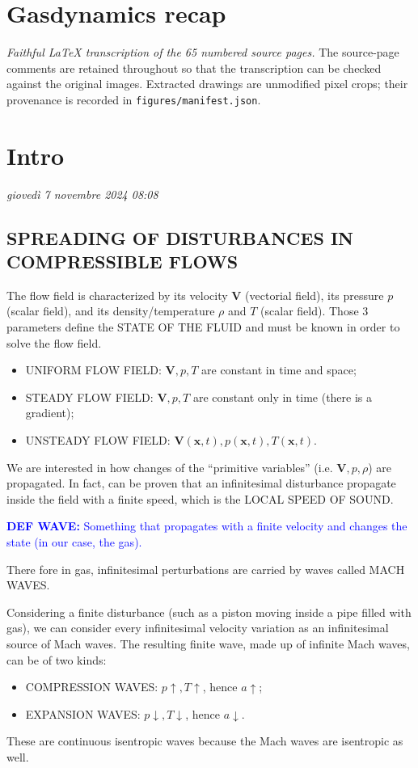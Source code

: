 \documentclass[11pt]{article}
\newcommand{\vect}[1]{\boldsymbol{#1}}
\begin{document}
\section*{Gasdynamics recap}
\textit{Faithful LaTeX transcription of the 65 numbered source pages.}
The source-page comments are retained throughout so that the transcription can
be checked against the original images.  Extracted drawings are unmodified
pixel crops; their provenance is recorded in \texttt{figures/manifest.json}.

\section*{Intro}
\textit{giovedì 7 novembre 2024 08:08}

\subsection*{SPREADING OF DISTURBANCES IN COMPRESSIBLE FLOWS}

The flow field is characterized by its velocity \(\vect{V}\) (vectorial
field), its pressure \(p\) (scalar field), and its density/temperature
\(\rho\) and \(T\) (scalar field). Those 3 parameters define the STATE OF THE
FLUID and must be known in order to solve the flow field.

\begin{itemize}
  \item UNIFORM FLOW FIELD: \(\vect{V},p,T\) are constant in time and space;
  \item STEADY FLOW FIELD: \(\vect{V},p,T\) are constant only in time (there
  is a gradient);
  \item UNSTEADY FLOW FIELD:
  \(\vect{V}(\vect{x},t),p(\vect{x},t),T(\vect{x},t)\).
\end{itemize}

We are interested in how changes of the ``primitive variables'' (i.e.
\(\vect{V},p,\rho\)) are propagated. In fact, can be proven that an
infinitesimal disturbance propagate inside the field with a finite speed,
which is the LOCAL SPEED OF SOUND.

\textcolor{blue}{\textbf{DEF WAVE:} Something that propagates with a finite
velocity and changes the state (in our case, the gas).}

There fore in gas, infinitesimal perturbations are carried by waves called
MACH WAVES.

Considering a finite disturbance (such as a piston moving inside a pipe filled
with gas), we can consider every infinitesimal velocity variation as an
infinitesimal source of Mach waves. The resulting finite wave, made up of
infinite Mach waves, can be of two kinds:
\begin{itemize}
  \item COMPRESSION WAVES: \(p\uparrow,T\uparrow\), hence \(a\uparrow\);
  \item EXPANSION WAVES: \(p\downarrow,T\downarrow\), hence \(a\downarrow\).
\end{itemize}
These are continuous isentropic waves because the Mach waves are isentropic as
well.
\end{document}

